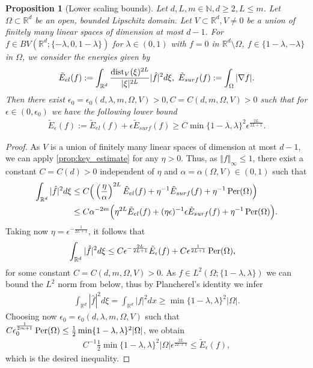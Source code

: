\documentclass[a4paper, 10pt, twoside, notitlepage]{amsart}
\theoremstyle{plain}
\newtheorem{prop}{Proposition}[section]
\newcommand{\R}{\mathbb{R}}
\newcommand{\N}{\mathbb{N}}
\begin{document}
			\begin{prop}[Lower scaling bounds] 
			\label{thm:LowerScalingUnionVS} 
			Let $d,L,m \in \N, d \geq 2, L \leq m$. Let $\Omega \subset \R^d$ be an open, bounded Lipschitz domain.  Let $V \subset \R^d, V \neq 0$ be a union of
				finitely many linear spaces of dimension at most $d-1$.  For $f \in BV(\R^d;\{-\lambda,0,1-\lambda\})$ for $\lambda \in (0,1)$ with $f = 0$ in $\R^d \setminus \Omega$, $f \in \{1-\lambda,-\lambda\}$ in $\Omega$, we consider the energies given by
				\begin{align*}
					\tilde{E}_{el}(f) := \int_{\R^d} \frac{\dist_V(\xi)^{2L}}{|\xi|^{2L}} |\hat{f}|^2 d\xi, \ \tilde{E}_{surf}(f) := \int_{\Omega} |\nabla f|.
				\end{align*}
				Then there exist $\epsilon_0 = \epsilon_0(d,\lambda,m,\Omega, V) > 0, C = C(d,m,\Omega, V) > 0$ such that for $\epsilon \in (0,\epsilon_0)$ we have the following lower bound
				\begin{align*}
					\tilde{E}_{\epsilon}(f) := \tilde{E}_{el}(f) + \epsilon \tilde{E}_{surf}(f) \geq C \min\{1-\lambda,\lambda\}^2 \epsilon^{\frac{2L}{2L+1}}.
				\end{align*}
			\end{prop}
    			\begin{proof}
				As $V$ is a union of finitely many linear spaces of dimension at most $d-1$, we can apply \cref{prop:key_estimate} for any $\eta >0$. Thus, as $\Vert f \Vert_\infty \leq 1$, there exist a constant $C = C(d)>0$
				independent of $\eta$ and $\alpha = \alpha(\Omega,V) \in (0,1)$ such that
				\begin{align*}
					\int_{\R^d} |\hat{f}|^2 d\xi & \leq C \Big( \left(\frac{\eta}{\alpha}\right)^{2L} \tilde{E}_{el}(f) + \eta^{-1} \tilde{E}_{surf}(f) + \eta^{-1} \Per(\Omega) \Big) \\
					& \leq C \alpha^{-2m} \Big( \eta^{2L} \tilde{E}_{el}(f) + (\eta \epsilon)^{-1} \epsilon \tilde{E}_{surf}(f) + \eta^{-1} \Per(\Omega) \Big).
				\end{align*}
				Taking now $\eta = \epsilon^{-\frac{1}{2L+1}}$, it follows that
				\begin{align*}
					\int_{\R^d} |\hat{f}|^2 d\xi & \leq C \epsilon^{-\frac{2L}{2L+1}} \tilde{E}_\epsilon(f) + C \epsilon^{\frac{1}{2L+1}} \Per(\Omega),
				\end{align*}
				for some constant $C = C(d,m,\Omega,V)>0$.
				As $f \in L^2(\Omega;\{1-\lambda,\lambda\})$ we can bound the $L^2$ norm from below, thus by Plancherel's identity we infer
				\begin{align*}
					\int_{\R^d} |\hat{f}|^2 d\xi = \int_{\R^d} |f|^2 dx \geq \min\{1-\lambda,\lambda\}^2 |\Omega|.
				\end{align*}
				Choosing now $\epsilon_0 = \epsilon_0(d,\lambda,m, \Omega, V)$ such that $C \epsilon_0^{\frac{1}{2m+1}} \operatorname{Per}(\Omega) \leq \frac{1}{2} \min\{1-\lambda,\lambda\}^2 |\Omega|$, we obtain
				\begin{align*}
					C^{-1} \frac{1}{2} \min\{1-\lambda,\lambda\}^2 |\Omega|  \epsilon^{\frac{2L}{2L+1}} \leq \tilde{E}_\epsilon(f),
				\end{align*}
				which is the desired inequality.
                              \end{proof}
\end{document}
